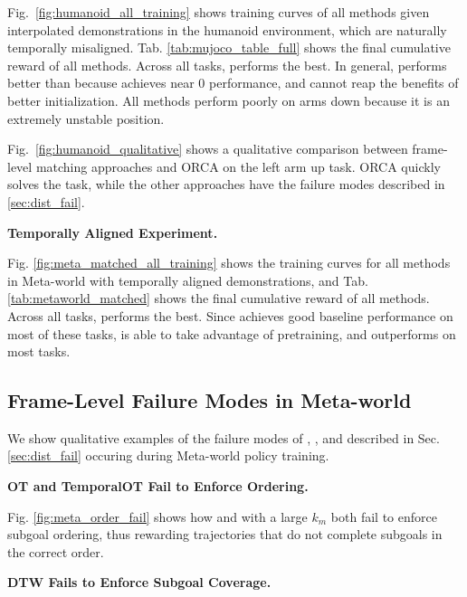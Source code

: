 

Fig.~\ref{fig:humanoid_all_training} shows training curves of all methods given interpolated demonstrations in the humanoid environment, which are naturally temporally misaligned. Tab. \ref{tab:mujoco_table_full} shows the final cumulative reward of all methods. Across all tasks, \orcanp{} performs the best. In general, \orcanp{} performs better than \orca{} because \tot{} achieves near 0 performance, and \orca{} cannot reap the benefits of better initialization. All methods perform poorly on arms down because it is an extremely unstable position. 

Fig.~\ref{fig:humanoid_qualitative} shows a qualitative comparison between frame-level matching approaches and ORCA on the left arm up task. ORCA quickly solves the task, while the other approaches have the failure modes described in \ref{sec:dist_fail}.




\textbf{Temporally Aligned Experiment.}


Fig. \ref{fig:meta_matched_all_training} shows the training curves for all methods in Meta-world with temporally aligned demonstrations, and Tab.\ref{tab:metaworld_matched} shows the final cumulative reward of all methods. Across all tasks, \orca{} performs the best. Since \tot{} achieves good baseline performance on most of these tasks, \orca{} is able to take advantage of pretraining, and outperforms \orcanp{} on most tasks.

\subsection{Frame-Level Failure Modes in Meta-world\label{app:metaworld_qual}}
We show qualitative examples of the failure modes of \ot{}, \tot{}, and \dtw{} described in Sec. \ref{sec:dist_fail} occuring during Meta-world policy training. 

\textbf{OT and TemporalOT Fail to Enforce Ordering.}

Fig. \ref{fig:meta_order_fail} shows how \ot{} and \tot{} with a large $k_m$ both fail to enforce subgoal ordering, thus rewarding trajectories that do not complete subgoals in the correct order.


\textbf{DTW Fails to Enforce Subgoal Coverage.}
 
